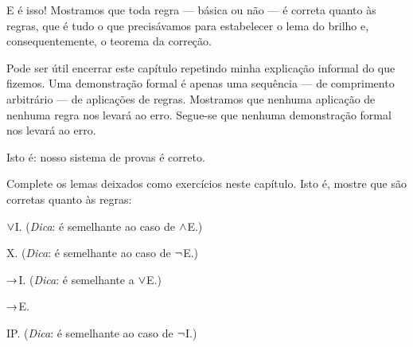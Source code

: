 E é isso! Mostramos que toda regra — básica ou não — é correta quanto às regras, que é tudo o que precisávamos para estabelecer o lema do brilho e, consequentemente, o teorema da correção.

Pode ser útil encerrar este capítulo repetindo minha explicação informal do que fizemos. Uma demonstração formal é apenas uma sequência — de comprimento arbitrário — de aplicações de regras. Mostramos que nenhuma aplicação de nenhuma regra nos levará ao erro. Segue-se que nenhuma demonstração formal nos levará ao erro.




Isto é: nosso sistema de provas é correto.

\practiceproblems

\problempart
\label{pr.Soundness}
Complete os lemas deixados como exercícios neste capítulo. Isto é, mostre que são corretas quanto às regras:
	\begin{compactlist}
		\item $\vee$I. (\emph{Dica}: é semelhante ao caso de $\wedge$E.)
		\item X. (\emph{Dica}: é semelhante ao caso de $\neg$E.)
		\item $\rightarrow$I. (\emph{Dica}: é semelhante a $\vee$E.)
		\item $\rightarrow$E.
		\item IP. (\emph{Dica}: é semelhante ao caso de $\neg$I.)
	\end{compactlist}

